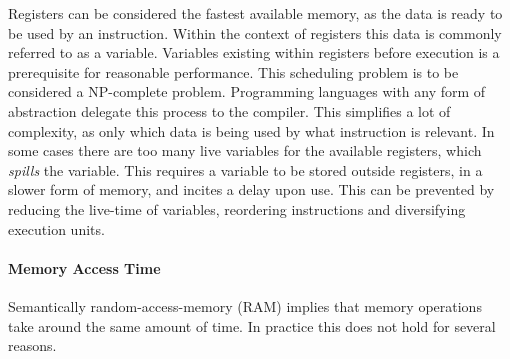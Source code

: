 \documentclass{article}
\begin{document}
Registers can be considered the fastest available memory, as the data is ready to be used by an instruction.
Within the context of registers this data is commonly referred to as a variable.
Variables existing within registers before execution is a prerequisite for reasonable performance.
This scheduling problem is to be considered a NP-complete problem\cite{register-allocation}.
Programming languages with any form of abstraction delegate this process to the compiler.
This simplifies a lot of complexity, as only which data is being used by what instruction is relevant.
In some cases there are too many live variables for the available registers, which {\it spills} the variable.
This requires a variable to be stored outside registers, in a slower form of memory, and incites a delay upon use.
This can be prevented by reducing the live-time of variables, reordering instructions and diversifying execution units.  

\paragraph{Memory Access Time}

Semantically random-access-memory (RAM) implies that memory operations take around the same amount of time.
In practice this does not hold for several reasons.
\end{document}
